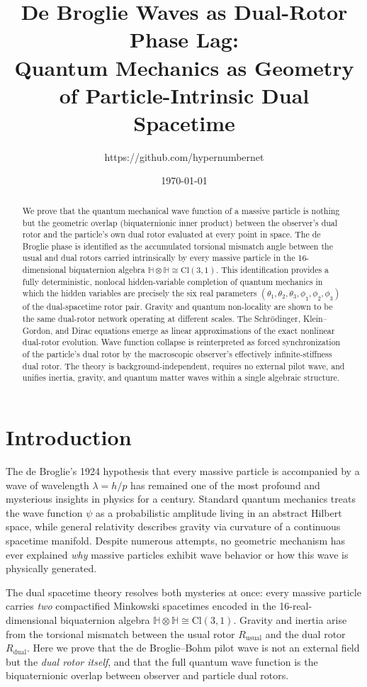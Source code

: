 \documentclass[dvipdfmx,a4paper]{article}
\title{De Broglie Waves as Dual-Rotor Phase Lag:\\ Quantum Mechanics as Geometry of Particle-Intrinsic Dual Spacetime}
\author{https://github.com/hypernumbernet}
\date{\today}
\begin{document}
\maketitle

\begin{abstract}
We prove that the quantum mechanical wave function of a massive particle is nothing but the geometric overlap (biquaternionic inner product) between the observer's dual rotor and the particle's own dual rotor evaluated at every point in space. The de Broglie phase is identified as the accumulated torsional mismatch angle between the usual and dual rotors carried intrinsically by every massive particle in the 16-dimensional biquaternion algebra $\mathbb{H}\otimes\mathbb{H}\cong\mathrm{Cl}(3,1)$. This identification provides a fully deterministic, nonlocal hidden-variable completion of quantum mechanics in which the hidden variables are precisely the six real parameters $(\theta_1,\theta_2,\theta_3,\phi_1,\phi_2,\phi_3)$ of the dual-spacetime rotor pair. Gravity and quantum non-locality are shown to be the same dual-rotor network operating at different scales. The Schrödinger, Klein–Gordon, and Dirac equations emerge as linear approximations of the exact nonlinear dual-rotor evolution. Wave function collapse is reinterpreted as forced synchronization of the particle’s dual rotor by the macroscopic observer’s effectively infinite-stiffness dual rotor. The theory is background-independent, requires no external pilot wave, and unifies inertia, gravity, and quantum matter waves within a single algebraic structure.
\end{abstract}

\section{Introduction}

The de Broglie’s 1924 hypothesis that every massive particle is accompanied by a wave of wavelength $\lambda = h/p$ has remained one of the most profound and mysterious insights in physics for a century. Standard quantum mechanics treats the wave function $\psi$ as a probabilistic amplitude living in an abstract Hilbert space, while general relativity describes gravity via curvature of a continuous spacetime manifold. Despite numerous attempts, no geometric mechanism has ever explained \emph{why} massive particles exhibit wave behavior or how this wave is physically generated.

The dual spacetime theory resolves both mysteries at once: every massive particle carries \emph{two} compactified Minkowski spacetimes encoded in the 16-real-dimensional biquaternion algebra $\mathbb{H}\otimes\mathbb{H}\cong\mathrm{Cl}(3,1)$. Gravity and inertia arise from the torsional mismatch between the usual rotor $R_\text{usual}$ and the dual rotor $R_\text{dual}$. Here we prove that the de Broglie–Bohm pilot wave is not an external field but the \emph{dual rotor itself}, and that the full quantum wave function is the biquaternionic overlap between observer and particle dual rotors.
\end{document}

